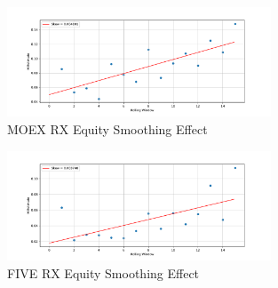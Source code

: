 \begin{figure}[h]
    \centering
    \includegraphics[width=0.7\textwidth]{fig/MOEX RX Equity Smoothing Effect.pdf}
    \caption{MOEX RX Equity Smoothing Effect}
\end{figure} 

\begin{figure}[h]
    \centering
    \includegraphics[width=0.7\textwidth]{fig/FIVE RX Equity Smoothing Effect.pdf}
    \caption{FIVE RX Equity Smoothing Effect}
\end{figure}  